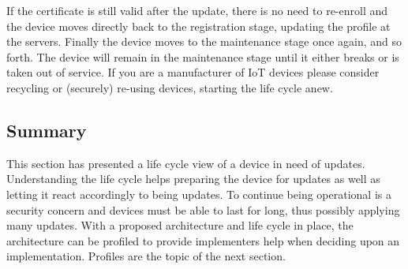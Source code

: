 \documentclass[0-thesis.tex]{subfiles}
\begin{document}
If the certificate is still valid after the update, there is no need to re-enroll and the
device moves directly back to the registration stage, updating the profile at the servers.
Finally the device moves to the maintenance stage once again, and so forth. The device
will remain in the maintenance stage until it either breaks or is taken out of service. If
you are a manufacturer of IoT devices please consider recycling or (securely) re-using
devices, starting the life cycle anew.

\subsection{Summary}
\label{ssec:life-cycle-summary}
This section has presented a life cycle view of a device in need of updates. Understanding
the life cycle helps preparing the device for updates as well as letting it react
accordingly to being updates. To continue being operational is a security concern and
devices must be able to last for long, thus possibly applying many updates. With a
proposed architecture and life cycle in place, the architecture can be profiled to provide
implementers help when deciding upon an implementation. Profiles are the topic of the next
section.
\end{document}
